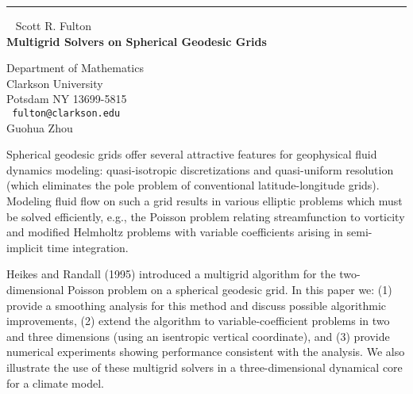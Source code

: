 \documentclass{report}
\begin{document}
\begin{center}

\rule{6in}{1pt} \
{\large
Scott R. Fulton
\\ {\bf
Multigrid Solvers on Spherical Geodesic Grids
}}

Department of Mathematics
\\
Clarkson University
\\
Potsdam NY 13699-5815
\\ {\tt
fulton@clarkson.edu
}
\\
Guohua Zhou
\end{center}

Spherical geodesic grids offer several attractive features for
geophysical fluid dynamics modeling: quasi-isotropic discretizations
and quasi-uniform resolution (which eliminates the pole problem of
conventional latitude-longitude grids). Modeling fluid flow on such a
grid results in various elliptic problems which must be solved
efficiently, e.g., the Poisson problem relating streamfunction to
vorticity and modified Helmholtz problems with variable coefficients
arising in semi-implicit time integration.

Heikes and Randall (1995) introduced a multigrid algorithm for the
two-dimensional Poisson problem on a spherical geodesic grid. In this
paper we: (1) provide a smoothing analysis for this method and discuss
possible algorithmic improvements, (2) extend the algorithm to
variable-coefficient problems in two and three dimensions (using an
isentropic vertical coordinate), and (3) provide numerical experiments
showing performance consistent with the analysis. We also illustrate
the use of these multigrid solvers in a three-dimensional dynamical
core for a climate model.
\end{document}
